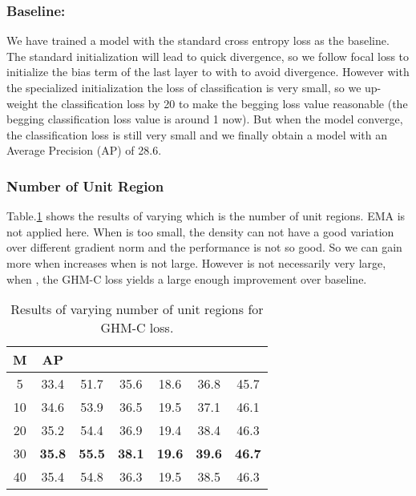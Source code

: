 \documentclass[letterpaper]{article} \usepackage{aaai19}  \usepackage{times}  \usepackage{helvet}  \usepackage{courier}  \usepackage{url}  \usepackage{graphicx}  \usepackage{amsmath,amssymb}
\begin{document}
\subsubsection{Baseline:} We have trained a model with the standard cross entropy loss as the baseline. The standard initialization will lead to quick divergence, so we follow focal loss \cite{focal} to initialize the bias term of the last layer to  with  to avoid divergence. However with the specialized initialization the loss of classification is very small, so we up-weight the classification loss by 20 to make the begging loss value reasonable (the begging classification loss value is around 1 now). But when the model converge, the classification loss is still very small and we finally obtain a model with an Average Precision (AP) of 28.6.

\subsubsection{Number of Unit Region}
Table.\ref{tab:num} shows the results of varying  which is the number of unit regions. EMA is not applied here. When  is too small, the density can not have a good variation over different gradient norm and the performance is not so good. So we can gain more when  increases when  is not large. However  is not necessarily very large, when , the GHM-C loss yields a large enough improvement over  baseline.
\begin{table}[!ht]
\begin{center}
\begin{tabular}{| c | c  c  c  c  c  c |}
\hline
M & AP &  &  &  &  &  \\
\hline
5 & 33.4 & 51.7 & 35.6 & 18.6 & 36.8 & 45.7 \\
10 & 34.6 & 53.9 & 36.5 & 19.5 & 37.1 & 46.1 \\
20 & 35.2 & 54.4 & 36.9 & 19.4 & 38.4 & 46.3 \\
30 & \textbf{35.8} & \textbf{55.5} & \textbf{38.1} & \textbf{19.6} & \textbf{39.6} & \textbf{46.7} \\
40 & 35.4 & 54.8 & 36.3 & 19.5 & 38.5 & 46.3 \\
\hline 
\end{tabular}
\caption{Results of varying number of unit regions for GHM-C loss.}
\label{tab:num}
\end{center}
\end{table}
\end{document}
